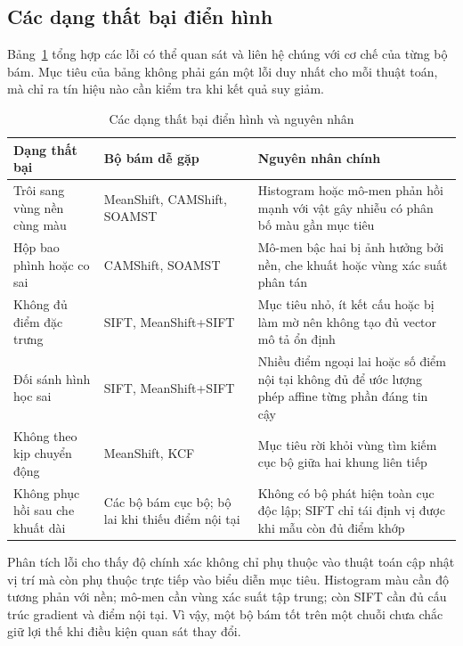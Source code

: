 \documentclass[12pt,a4paper]{article}
\numberwithin{equation}{section}
\begin{document}
\subsection{Các dạng thất bại điển hình}

Bảng~\ref{tab:failure-modes} tổng hợp các lỗi có thể quan sát và liên hệ chúng với cơ chế của từng
bộ bám. Mục tiêu của bảng không phải gán một lỗi duy nhất cho mỗi thuật toán, mà chỉ ra tín hiệu
nào cần kiểm tra khi kết quả suy giảm.

\begin{table}[H]
\centering
\caption{Các dạng thất bại điển hình và nguyên nhân}
\label{tab:failure-modes}
\footnotesize
\begin{tabular}{@{}>{\raggedright\arraybackslash}p{3.3cm}>{\raggedright\arraybackslash}p{4.2cm}>{\raggedright\arraybackslash}p{6.1cm}@{}}
\toprule
\textbf{Dạng thất bại} & \textbf{Bộ bám dễ gặp} & \textbf{Nguyên nhân chính} \\
\midrule
Trôi sang vùng nền cùng màu & MeanShift, CAMShift, SOAMST & Histogram hoặc mô-men phản hồi mạnh với vật gây nhiễu có phân bố màu gần mục tiêu \\
Hộp bao phình hoặc co sai & CAMShift, SOAMST & Mô-men bậc hai bị ảnh hưởng bởi nền, che khuất hoặc vùng xác suất phân tán \\
Không đủ điểm đặc trưng & SIFT, MeanShift+SIFT & Mục tiêu nhỏ, ít kết cấu hoặc bị làm mờ nên không tạo đủ vector mô tả ổn định \\
Đối sánh hình học sai & SIFT, MeanShift+SIFT & Nhiều điểm ngoại lai hoặc số điểm nội tại không đủ để ước lượng phép affine từng phần đáng tin cậy \\
Không theo kịp chuyển động & MeanShift, KCF & Mục tiêu rời khỏi vùng tìm kiếm cục bộ giữa hai khung liên tiếp \\
Không phục hồi sau che khuất dài & Các bộ bám cục bộ; bộ lai khi thiếu điểm nội tại & Không có bộ phát hiện toàn cục độc lập; SIFT chỉ tái định vị được khi mẫu còn đủ điểm khớp \\
\bottomrule
\end{tabular}
\end{table}

Phân tích lỗi cho thấy độ chính xác không chỉ phụ thuộc vào thuật toán cập nhật vị trí mà còn phụ
thuộc trực tiếp vào biểu diễn mục tiêu. Histogram màu cần độ tương phản với nền; mô-men cần vùng
xác suất tập trung; còn SIFT cần đủ cấu trúc gradient và điểm nội tại. Vì vậy, một bộ bám tốt trên một
chuỗi chưa chắc giữ lợi thế khi điều kiện quan sát thay đổi.
\end{document}
